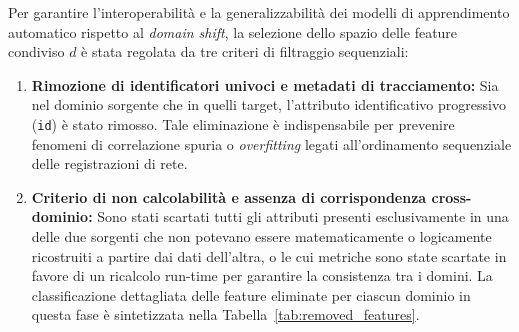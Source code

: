 Per garantire l'interoperabilità e la generalizzabilità dei modelli di apprendimento automatico rispetto al \textit{domain shift}, la selezione dello spazio delle feature condiviso $d$ è stata regolata da tre criteri di filtraggio sequenziali:

\begin{enumerate}
    \item \textbf{Rimozione di identificatori univoci e metadati di tracciamento:}
    Sia nel dominio sorgente che in quelli target, l'attributo identificativo progressivo (\texttt{id}) è stato rimosso. 
    Tale eliminazione è indispensabile per prevenire fenomeni di correlazione spuria o \textit{overfitting} legati all'ordinamento sequenziale delle registrazioni di rete.
    
    \item \textbf{Criterio di non calcolabilità e assenza di corrispondenza cross-dominio:}
    Sono stati scartati tutti gli attributi presenti esclusivamente in una delle due sorgenti che non potevano essere matematicamente o logicamente ricostruiti a partire dai dati dell'altra, o le cui metriche sono state scartate in favore di un ricalcolo run-time per garantire la consistenza tra i domini. 
    La classificazione dettagliata delle feature eliminate per ciascun dominio in questa fase è sintetizzata nella Tabella~\ref{tab:removed_features}.


\end{enumerate}
